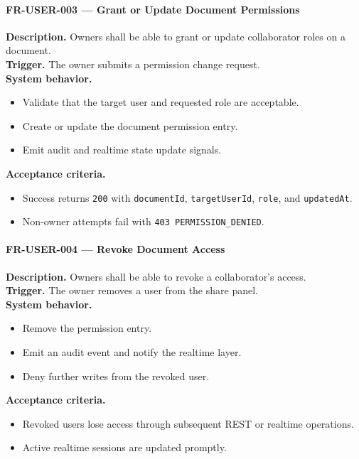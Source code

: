 \paragraph{FR-USER-003 --- Grant or Update Document Permissions}
\textbf{Description.} Owners shall be able to grant or update collaborator roles on a document.\\
\textbf{Trigger.} The owner submits a permission change request.\\
\textbf{System behavior.}
\begin{itemize}
  \item Validate that the target user and requested role are acceptable.
  \item Create or update the document permission entry.
  \item Emit audit and realtime state update signals.
\end{itemize}
\textbf{Acceptance criteria.}
\begin{itemize}
  \item Success returns \texttt{200} with \texttt{documentId}, \texttt{targetUserId}, \texttt{role}, and \texttt{updatedAt}.
  \item Non-owner attempts fail with \texttt{403 PERMISSION\_DENIED}.
\end{itemize}

\paragraph{FR-USER-004 --- Revoke Document Access}
\textbf{Description.} Owners shall be able to revoke a collaborator's access.\\
\textbf{Trigger.} The owner removes a user from the share panel.\\
\textbf{System behavior.}
\begin{itemize}
  \item Remove the permission entry.
  \item Emit an audit event and notify the realtime layer.
  \item Deny further writes from the revoked user.
\end{itemize}
\textbf{Acceptance criteria.}
\begin{itemize}
  \item Revoked users lose access through subsequent REST or realtime operations.
  \item Active realtime sessions are updated promptly.
\end{itemize}

